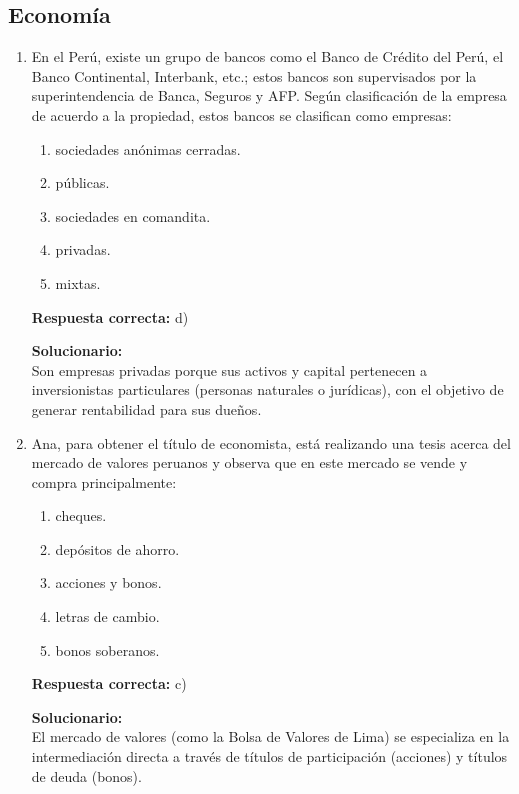\subsection*{Economía}

\begin{enumerate}
	\item En el Perú, existe un grupo de bancos como el Banco de Crédito del Perú, el Banco Continental, Interbank, etc.; estos bancos son supervisados por la superintendencia de Banca, Seguros y AFP. Según clasificación de la empresa de acuerdo a la propiedad, estos bancos se clasifican como empresas:
	\begin{enumerate}[label=\alph*)]
		\item sociedades anónimas cerradas.
		\item públicas.
		\item sociedades en comandita.
		\item privadas.
		\item mixtas.
	\end{enumerate}
	\textbf{Respuesta correcta:} d)
	
	\vspace{2mm}
	\textbf{Solucionario:}\\
	Son empresas privadas porque sus activos y capital pertenecen a inversionistas particulares (personas naturales o jurídicas), con el objetivo de generar rentabilidad para sus dueños.
	
	\vspace{6mm}
	
	\item Ana, para obtener el título de economista, está realizando una tesis acerca del mercado de valores peruanos y observa que en este mercado se vende y compra principalmente:
	\begin{enumerate}[label=\alph*)]
		\item cheques.
		\item depósitos de ahorro.
		\item acciones y bonos.
		\item letras de cambio.
		\item bonos soberanos.
	\end{enumerate}
	\textbf{Respuesta correcta:} c)
	
	\vspace{2mm}
	\textbf{Solucionario:}\\
	El mercado de valores (como la Bolsa de Valores de Lima) se especializa en la intermediación directa a través de títulos de participación (acciones) y títulos de deuda (bonos).
	

\end{enumerate}
